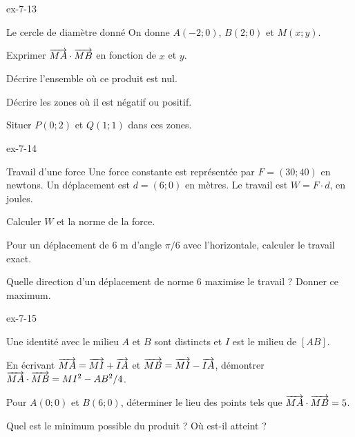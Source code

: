 \begin{blocLivre}{ex-7-13}
\begin{exercice}[3]{Le cercle de diamètre donné}
On donne $A(-2;0)$, $B(2;0)$ et $M(x;y)$.\begin{questions}
\item Exprimer $\overrightarrow{MA}\cdot\overrightarrow{MB}$ en fonction de $x$ et $y$.
\item Décrire l’ensemble où ce produit est nul.
\item Décrire les zones où il est négatif ou positif.
\item Situer $P(0;2)$ et $Q(1;1)$ dans ces zones.
\end{questions}

\label{figgeo-07-13-ex}
\end{exercice}
\end{blocLivre}
\begin{blocLivre}{ex-7-14}
\begin{exercice}[3]{Travail d'une force}
Une force constante est représentée par $F=(30;40)$ en newtons. Un déplacement est $d=(6;0)$ en mètres. Le travail est $W=F\cdot d$, en joules.\begin{questions}
\item Calculer $W$ et la norme de la force.
\item Pour un déplacement de 6 m d’angle $\pi/6$ avec l’horizontale, calculer le travail exact.
\item Quelle direction d’un déplacement de norme 6 maximise le travail ? Donner ce maximum.
\end{questions}

\label{figgeo-07-14-ex}
\end{exercice}
\end{blocLivre}
\begin{blocLivre}{ex-7-15}
\begin{exercice}[3]{Une identité avec le milieu}
$A$ et $B$ sont distincts et $I$ est le milieu de $[AB]$.\begin{questions}
\item En écrivant $\overrightarrow{MA}=\overrightarrow{MI}+\overrightarrow{IA}$ et $\overrightarrow{MB}=\overrightarrow{MI}-\overrightarrow{IA}$, démontrer $\overrightarrow{MA}\cdot\overrightarrow{MB}=MI^2-AB^2/4$.
\item Pour $A(0;0)$ et $B(6;0)$, déterminer le lieu des points tels que $\overrightarrow{MA}\cdot\overrightarrow{MB}=5$.
\item Quel est le minimum possible du produit ? Où est-il atteint ?
\end{questions}

\label{figgeo-07-15-ex}
\end{exercice}
\end{blocLivre}

